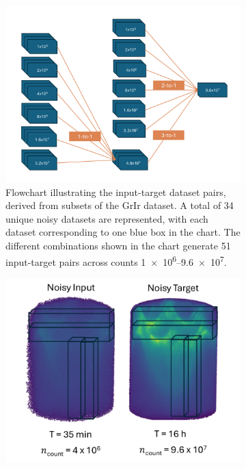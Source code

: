 \begin{figure}[h]
    \centering
    \begin{subfigure}[t]{0.59\linewidth}
        \centering
        \includegraphics[width=1\linewidth]{images/training_flowchart.pdf}
        \caption{Flowchart illustrating the input-target dataset pairs, derived from subsets of the \gls{GrIr} dataset. A total of \num{34} unique noisy datasets are represented, with each dataset corresponding to one blue box in the chart. The different combinations shown in the chart generate \num{51} input-target pairs across counts \numrange{1e6}{9.6e7}.}
        \label{fig:training-data-flowchart}
    \end{subfigure}
    \hfill
    \begin{subfigure}[t]{0.39\linewidth}
        \centering
        \includegraphics[width=1\linewidth]{images/training_3d_patch_example.pdf}

\end{subfigure}
\end{figure}
